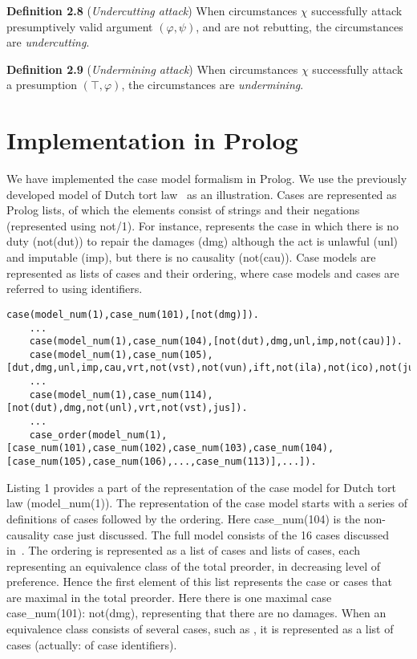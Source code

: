 \documentclass{IOS-Book-Article}
\begin{document}
\textbf{Definition 2.8} (\textit{Undercutting attack}) When circumstances $\chi$ successfully attack presumptively valid argument $(\varphi, \psi)$, and are not rebutting, the circumstances are \textit{undercutting}.

\textbf{Definition 2.9} (\textit{Undermining attack}) When circumstances $\chi$ successfully attack a presumption $(\top, \varphi)$, the circumstances are \textit{undermining}.

\section{Implementation in Prolog}
\noindent We have implemented the case model formalism in Prolog. We use the previously developed model of Dutch tort law~\cite{Verheij2017Formalizing} as an illustration. Cases are represented as Prolog lists, of which the elements consist of strings and their negations (represented using {\mf not/1}). For instance, {} represents the case in which there is no duty ({\mf not(dut)}) to repair the damages ({\mf dmg}) although the act is unlawful ({\mf unl}) and imputable ({\mf imp}), but there is no causality ({\mf not(cau)}). Case models are represented as lists of cases and their ordering, where case models and cases are referred to using identifiers. 
	\begin{lstlisting}[caption={Definition of the Dutch tort law case model in Prolog},captionpos=b,float]
	case(model_num(1),case_num(101),[not(dmg)]).
	...
	case(model_num(1),case_num(104),[not(dut),dmg,unl,imp,not(cau)]).
	case(model_num(1),case_num(105),[dut,dmg,unl,imp,cau,vrt,not(vst),not(vun),ift,not(ila),not(ico),not(jus),prp]).
	...
	case(model_num(1),case_num(114),[not(dut),dmg,not(unl),vrt,not(vst),jus]).
	...
	case_order(model_num(1),[case_num(101),case_num(102),case_num(103),case_num(104),[case_num(105),case_num(106),...,case_num(113)],...]).
	\end{lstlisting}

Listing 1 provides a part of the representation of the case model for Dutch tort law ({\mf model\_num(1)}). 
The representation of the case model starts with a series of definitions of cases followed by the ordering. Here {\mf case\_num(104)} is the non-causality case just discussed. The full model consists of the 16 cases discussed in~\cite{Verheij2017Formalizing}. The ordering is represented as a list of cases and lists of cases, each representing an equivalence class of the total preorder, in decreasing level of preference. Hence the first element of this list represents the case or cases that are maximal in the total preorder. Here there is one maximal case {\mf case\_num(101): not(dmg)}, representing that there are no damages. When an equivalence class consists of several cases, such as {}, it is represented as a list of cases (actually: of case identifiers).
\end{document}
